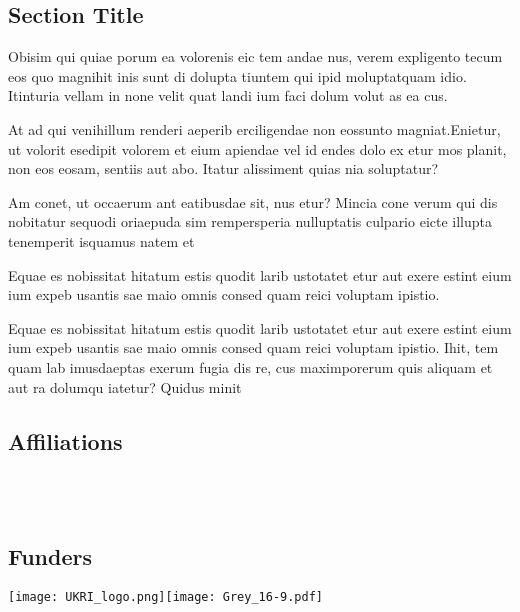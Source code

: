 \documentclass[
]{ImperialPoster}
\begin{document}
\begin{multicols}{3}
	\columnbreak{} %


	\section{Section Title}

	{
		\small %
		Obisim qui quiae porum ea volorenis eic tem andae nus, verem expligento tecum eos quo magnihit inis sunt di dolupta tiuntem qui ipid moluptatquam idio. Itinturia vellam in none velit quat landi ium faci dolum volut as ea cus.

		At ad qui venihillum renderi aeperib erciligendae non eossunto magniat.Enietur, ut volorit esedipit volorem et eium apiendae vel id endes dolo ex etur mos planit, non eos eosam, sentiis aut abo. Itatur alissiment quias nia soluptatur?

		Am conet, ut occaerum ant eatibusdae sit, nus etur? Mincia cone verum qui dis nobitatur sequodi oriaepuda sim rempersperia nulluptatis culpario eicte illupta tenemperit isquamus natem et\par
	}

	Equae es nobissitat hitatum estis quodit larib ustotatet \textcolor{ICLBlue}{etur aut exere estint eium ium expeb} usantis sae maio omnis consed quam reici voluptam ipistio.

	\vspace{0.31\textheight} %

	Equae es nobissitat hitatum estis quodit larib ustotatet etur aut exere estint eium ium expeb usantis sae maio omnis consed quam reici voluptam ipistio. Ihit, tem quam lab imusdaeptas exerum fugia dis re, cus maximporerum quis aliquam et aut ra dolumqu iatetur? Quidus minit

	\subsection{Affiliations}

	\\
	\\

	\subsection{Funders}

	\texttt{[image: UKRI\_logo.png]}\hfill\texttt{[image: Grey\_16-9.pdf]} %

\end{multicols}
\end{document}
